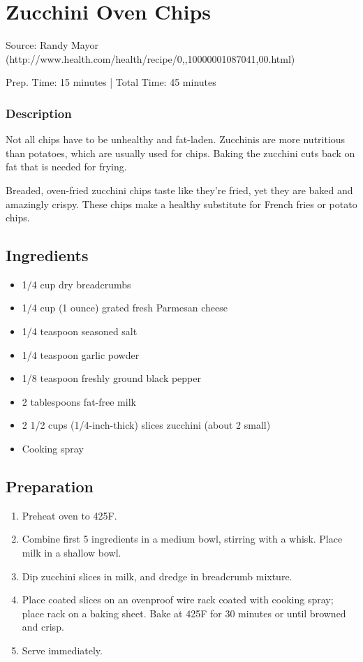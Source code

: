 \section{Zucchini Oven Chips}

Source: Randy Mayor (http://www.health.com/health/recipe/0,,10000001087041,00.html)

\begin{center}
Prep. Time: 15 minutes |
Total Time: 45 minutes
\end{center}

\subsubsection{Description}
Not all chips have to be unhealthy and fat-laden. Zucchinis are more nutritious
than potatoes, which are usually used for chips. Baking the zucchini cuts back
on fat that is needed for frying.

Breaded, oven-fried zucchini chips taste like they're fried, yet they are baked
and amazingly crispy. These chips make a healthy substitute for French fries or
potato chips.

\subsection{Ingredients}
\begin{itemize}
    \item 1/4 cup dry breadcrumbs
    \item 1/4 cup (1 ounce) grated fresh Parmesan cheese
    \item 1/4 teaspoon seasoned salt
    \item 1/4 teaspoon garlic powder
    \item 1/8 teaspoon freshly ground black pepper
    \item 2 tablespoons fat-free milk
    \item 2 1/2 cups (1/4-inch-thick) slices zucchini (about 2 small)
    \item Cooking spray
\end{itemize}

\subsection{Preparation}
\begin{enumerate}
    \item Preheat oven to 425F.
    \item Combine first 5 ingredients in a medium bowl, stirring with a whisk. Place milk in a shallow bowl.
    \item Dip zucchini slices in milk, and dredge in breadcrumb mixture.
    \item Place coated slices on an ovenproof wire rack coated with cooking spray; place rack on a baking sheet. Bake at 425F for 30 minutes or until browned and crisp.
    \item Serve immediately.
\end{enumerate}

